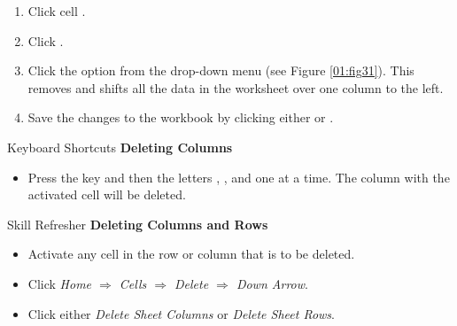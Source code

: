 \begin{enumbox}
	\begin{enumerate}
		\item Click cell .
		\item Click .
		\item Click the  option from the drop-down menu (see Figure \ref{01:fig31}). This removes  and shifts all the data in the worksheet over one column to the left.
		\item Save the changes to the workbook by clicking either  or .
	\end{enumerate}
\end{enumbox}

\begin{center}
	\begin{shtcutbox}{Keyboard Shortcuts}
		\textbf{Deleting Columns}
		\\
		\begin{itemize}
			\setlength{\itemsep}{0pt}
			\setlength{\parskip}{0pt}
			\setlength{\parsep}{0pt}
			
			\item Press the  key and then the letters , , and  one at a time. The column with the activated cell will be deleted.
			
		\end{itemize}
	\end{shtcutbox}
\end{center}

\begin{center}
	\begin{sklbox}{Skill Refresher}
		\textbf{Deleting Columns and Rows}
		\\
		\begin{itemize}
			\setlength{\itemsep}{0pt}
			\setlength{\parskip}{0pt}
			\setlength{\parsep}{0pt}
			
			\item Activate any cell in the row or column that is to be deleted.
			\item Click \textit{Home $ \Rightarrow $ Cells $ \Rightarrow $ Delete $ \Rightarrow $ Down Arrow}.
			\item Click either \textit{Delete Sheet Columns} or \textit{Delete Sheet Rows}.
			
		\end{itemize}
	\end{sklbox}
\end{center}

